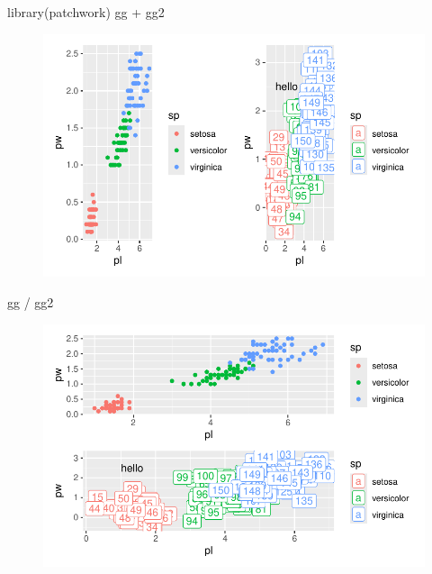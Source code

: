 \documentclass[
  letterpaper,
  DIV=11,
  numbers=noendperiod]{scrreprt}
\newenvironment{Shaded}{\begin{snugshade}}{\end{snugshade}}
\newcommand{\FunctionTok}[1]{\textcolor[rgb]{0.28,0.35,0.67}{#1}}
\newcommand{\NormalTok}[1]{\textcolor[rgb]{0.00,0.23,0.31}{#1}}
\newcommand{\SpecialCharTok}[1]{\textcolor[rgb]{0.37,0.37,0.37}{#1}}
\begin{document}
\begin{Shaded}
\begin{Highlighting}[]
\FunctionTok{library}\NormalTok{(patchwork)}
\NormalTok{gg }\SpecialCharTok{+}\NormalTok{ gg2}
\end{Highlighting}
\end{Shaded}

\begin{figure}[H]

{\centering \includegraphics{ggplot2_files/figure-pdf/unnamed-chunk-35-1.pdf}

}

\end{figure}

\begin{Shaded}
\begin{Highlighting}[]
\NormalTok{gg }\SpecialCharTok{/}\NormalTok{ gg2}
\end{Highlighting}
\end{Shaded}

\begin{figure}[H]

{\centering \includegraphics{ggplot2_files/figure-pdf/unnamed-chunk-35-2.pdf}

}

\end{figure}
\end{document}
